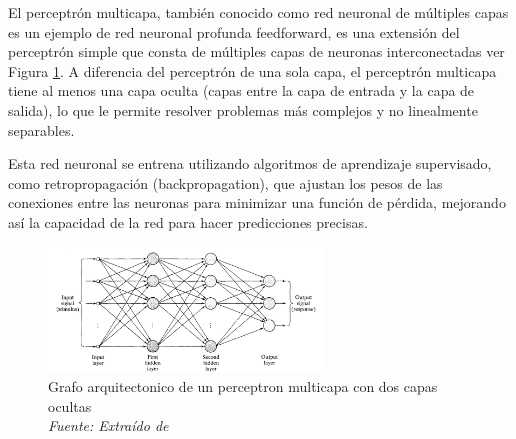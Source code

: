 El perceptrón multicapa, también conocido como red neuronal de múltiples capas es un ejemplo de red neuronal profunda feedforward, es una extensión del perceptrón simple que consta de múltiples capas de neuronas interconectadas ver Figura \ref{fig:an7}. A diferencia del perceptrón de una sola capa, el perceptrón multicapa tiene al menos una capa oculta (capas entre la capa de entrada y la capa de salida), lo que le permite resolver problemas más complejos y no linealmente separables.

Esta red neuronal se entrena utilizando algoritmos de aprendizaje supervisado, como retropropagación (backpropagation), que ajustan los pesos de las conexiones entre las neuronas para minimizar una función de pérdida, mejorando así la capacidad de la red para hacer predicciones precisas.

\begin{figure}[h!]
	\includegraphics[width=0.65\textwidth]{capitulo2/figuras/an7.png}
	\caption[Grafo arquitectonico de un perceptron multicapa con dos capas ocultas]{Grafo arquitectonico de un perceptron multicapa con dos capas ocultas
		\\\textit{Fuente: Extraído de} \protect\cite[p.281]{haykin1998neural}}
	\label{fig:an7}
\end{figure}

